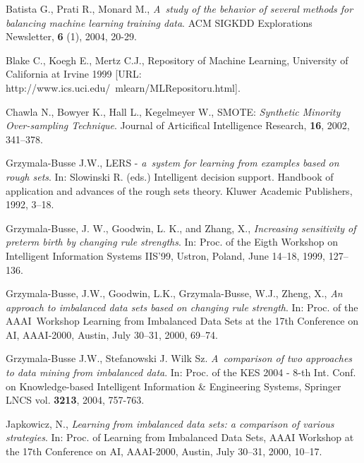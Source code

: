 \documentclass{AIMeth05}
\begin{document}
\begin{thebibliography}{17}

 Batista G., Prati R., Monard M., {\em A~study of the behavior
of several methods for balancing machine learning training data}. ACM SIGKDD
Explorations Newsletter, \textbf{6} (1), 2004, 20-29.

  Blake C., Koegh E., Mertz C.J.,
Repository of Machine Learning, University of California at Irvine
1999 [URL: http://www.ics.uci.edu/~mlearn/MLRepositoru.html].

 Chawla N., Bowyer K., Hall L., Kegelmeyer W., SMOTE:
{\em Synthetic Minority Over-sampling Technique}. Journal of Articifical
Intelligence Research, \textbf{16}, 2002, 341--378.



 Grzymala-Busse J.W., LERS - {\em a~system for learning from examples
based on rough sets}. In: Slowinski R. (eds.) Intelligent decision support.
Handbook of application and advances of the rough sets theory.  Kluwer
Academic Publishers, 1992, 3--18.

 Grzymala-Busse, J. W., Goodwin, L. K., and  Zhang, X.,
{\em Increasing sensitivity of preterm birth by changing rule strengths}.
In: Proc. of the Eigth Workshop on Intelligent Information Systems IIS'99,
Ustron, Poland, June 14--18, 1999, 127--136.


 Grzymala-Busse, J.W., Goodwin, L.K., Grzymala-Busse, W.J., Zheng,
X., {\em An approach to imbalanced data sets based on changing rule
strength}. In: Proc. of the AAAI~Workshop Learning from Imbalanced Data Sets
at the 17th Conference on AI, AAAI-2000, Austin, July 30--31, 2000, 69--74.


 Grzymala-Busse J.W., Stefanowski J. Wilk Sz.
\emph{A~comparison of two approaches to data mining from imbalanced data}.
In: Proc. of the KES 2004 - 8-th Int. Conf. on Knowledge-based Intelligent
Information \& Engineering Systems,  Springer LNCS vol. \textbf{3213}, 2004,
757-763.


 Japkowicz, N.,  {\em Learning from imbalanced data sets: a
comparison of various strategies}. In: Proc. of Learning from Imbalanced
Data Sets, AAAI Workshop at the 17th Conference on AI, AAAI-2000, Austin,
July 30--31, 2000, 10--17.


\end{thebibliography}
\end{document}

